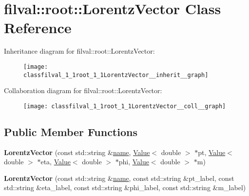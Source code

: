 \hypertarget{classfilval_1_1root_1_1LorentzVector}{}\section{filval\+:\+:root\+:\+:Lorentz\+Vector Class Reference}
\label{classfilval_1_1root_1_1LorentzVector}


Inheritance diagram for filval\+:\+:root\+:\+:Lorentz\+Vector\+:
\nopagebreak
\begin{figure}[H]
\begin{center}
\leavevmode
\texttt{[image: classfilval\_1\_1root\_1\_1LorentzVector\_\_inherit\_\_graph]}
\end{center}
\end{figure}


Collaboration diagram for filval\+:\+:root\+:\+:Lorentz\+Vector\+:
\nopagebreak
\begin{figure}[H]
\begin{center}
\leavevmode
\texttt{[image: classfilval\_1\_1root\_1\_1LorentzVector\_\_coll\_\_graph]}
\end{center}
\end{figure}
\subsection*{Public Member Functions}
\begin{DoxyCompactItemize}
\item 
\hypertarget{classfilval_1_1root_1_1LorentzVector_ab3f018feabbc033904d106b1ff87d5ef}{}\label{classfilval_1_1root_1_1LorentzVector_ab3f018feabbc033904d106b1ff87d5ef} 
{\bfseries Lorentz\+Vector} (const std\+::string \&\hyperlink{classfilval_1_1GenValue_a007e38c03ee041c2a657afa3d6e91ab1}{name}, \hyperlink{classfilval_1_1Value}{Value}$<$ double $>$ $\ast$pt, \hyperlink{classfilval_1_1Value}{Value}$<$ double $>$ $\ast$eta, \hyperlink{classfilval_1_1Value}{Value}$<$ double $>$ $\ast$phi, \hyperlink{classfilval_1_1Value}{Value}$<$ double $>$ $\ast$m)
\item 
\hypertarget{classfilval_1_1root_1_1LorentzVector_ad1c35a5718afdd529c05dcdfd0a332f3}{}\label{classfilval_1_1root_1_1LorentzVector_ad1c35a5718afdd529c05dcdfd0a332f3} 
{\bfseries Lorentz\+Vector} (const std\+::string \&\hyperlink{classfilval_1_1GenValue_a007e38c03ee041c2a657afa3d6e91ab1}{name}, const std\+::string \&pt\+\_\+label, const std\+::string \&eta\+\_\+label, const std\+::string \&phi\+\_\+label, const std\+::string \&m\+\_\+label)
\end{DoxyCompactItemize}
